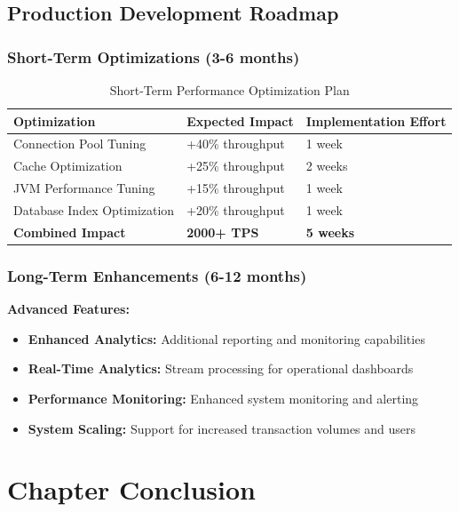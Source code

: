 \subsection{Production Development Roadmap}

\subsubsection{Short-Term Optimizations (3-6 months)}

\begin{table}[h]
\centering
\begin{tabular}{|l|l|l|}
\hline
\textbf{Optimization} & \textbf{Expected Impact} & \textbf{Implementation Effort} \\
\hline
Connection Pool Tuning & +40\% throughput & 1 week \\
Cache Optimization & +25\% throughput & 2 weeks \\
JVM Performance Tuning & +15\% throughput & 1 week \\
Database Index Optimization & +20\% throughput & 1 week \\
\hline
\textbf{Combined Impact} & \textbf{2000+ TPS} & \textbf{5 weeks} \\
\hline
\end{tabular}
\caption{Short-Term Performance Optimization Plan}
\end{table}

\subsubsection{Long-Term Enhancements (6-12 months)}

\textbf{Advanced Features:}
\begin{itemize}
    \item \textbf{Enhanced Analytics:} Additional reporting and monitoring capabilities
    \item \textbf{Real-Time Analytics:} Stream processing for operational dashboards
    \item \textbf{Performance Monitoring:} Enhanced system monitoring and alerting
    \item \textbf{System Scaling:} Support for increased transaction volumes and users
\end{itemize}

\section{Chapter Conclusion}

